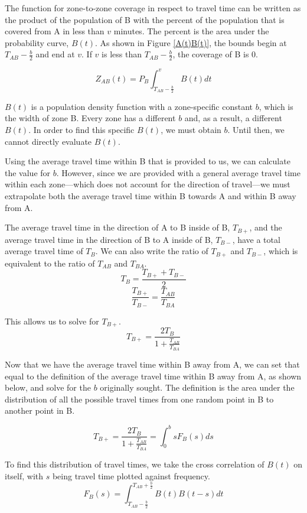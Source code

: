 \documentclass[notitlepage, 12pt]{article}
\begin{document}

The function for zone-to-zone coverage in respect to travel time can be written as the product of the population of B with the percent of the population that is covered from A in less than $v$ minutes. The percent is the area under the probability curve, $B(t)$. As shown in Figure \ref{A(t)B(t)}, the bounds begin at $T_{AB} - \frac{b}{2}$ and end at $v$. If $v$ is less than $T_{AB} - \frac{b}{2}$, the coverage of B is 0.

$$Z_{AB}(t) = P_B \int^v_{T_{AB} - \frac{b}{2}} B(t) dt$$

$B(t)$ is a population density function with a zone-specific constant $b$, which is the width of zone B. Every zone has a different $b$ and, as a result, a different $B(t)$. In order to find this specific $B(t)$, we must obtain $b$. Until then, we cannot directly evaluate $B(t)$.

Using the average travel time within B that is provided to us, we can calculate the value for $b$. However, since we are provided with a general average travel time within each zone---which does not account for the direction of travel---we must extrapolate both the average travel time within B towards A and within B away from A.

The average travel time in the direction of A to B inside of B, $T_{B+}$, and the average travel time in the direction of B to A
inside of B, $T_{B-}$, have a total average travel time of $T_B$. We can also write the ratio of $T_{B+}$ and $T_{B-}$,
which is equivalent to the ratio of $T_{AB}$ and $T_{BA}$.
$$T_B = \frac{T_{B+} + T_{B-}}{2}$$
$$\frac{T_{B+}}{T_{B-}} = \frac{T_{AB}}{T_{BA}}$$

This allows us to solve for $T_{B+}$.
$$T_{B+} = \frac {2T_B}{1+ \frac{T_{AB}}{T_{BA}}}$$

Now that we have the average travel time within B away from A, we can set that equal to the definition of the average travel time within B away from A, as shown below, and solve for the $b$ originally sought. The definition is  the area under the distribution of all the possible travel times from one random point in B to another point in B.

$$T_{B+} = \frac {2T_B}{1+ \frac{T_{AB}}{T_{BA}}} = \int^b_0 s F_B(s) ds$$

To find this distribution of travel times, we take the cross correlation of $B(t)$ on itself, with $s$ being  travel time plotted against frequency.
$$F_B(s) =\int^{T_{AB} + \frac{b}{2}}_{T_{AB} - \frac{b}{2}} B(t) B(t-s) dt$$
\end{document}
